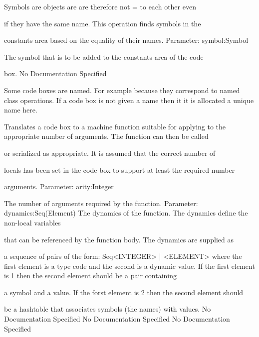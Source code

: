            Symbols are objects are are therefore not = to each other even

           if they have the same name. This operation finds symbols in the

           constants area based on the equality of their names.
           Parameter: symbol:Symbol

             The symbol that is to be added to the constants area of the code

             box.
No Documentation Specified

          Some code boxes are named. For example because they correspond to 
          named class operations. If a code box is not given a name then 
          it it is allocated a unique name here.

          Translates a code box to a machine function suitable for applying to 
          the appropriate number of arguments. The function can then be called

          or serialized as appropriate. It is assumed that the correct number of

          locals has been set in the code box to support at least the required number

          arguments. 
          Parameter: arity:Integer

            The number of arguments required by the function.
          Parameter: dynamics:Seq(Element)
            The dynamics of the function. The dynamics define the non-local variables

            that can be referenced by the function body. The dynamics are supplied as

            a sequence of pairs of the form: Seq{<INTEGER> | <ELEMENT>}
            where the first element is a type code and the second is a dynamic value.
            If the first element is 1 then the second element should be a pair containing

            a symbol and a value. If the forst element is 2 then the second element should

            be a hashtable that associates symbols (the names) with values.
No Documentation Specified
No Documentation Specified
No Documentation Specified

